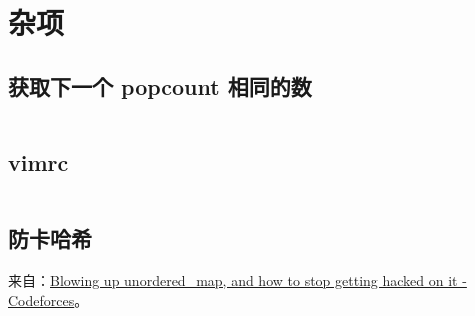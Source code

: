 \section{杂项}

\subsection{获取下一个 popcount 相同的数}

\inputminted{cpp}{misc/next_hamming/next_hamming.cpp}

\subsection{vimrc}

\inputminted{vim}{misc/vimrc/vimrc}

\subsection{防卡哈希}

来自：\href{https://codeforces.com/blog/entry/62393}{Blowing up unordered\_map,
and how to stop getting hacked on it - Codeforces}。

\inputminted{cpp}{misc/custom_hash/custom_hash.cpp}
